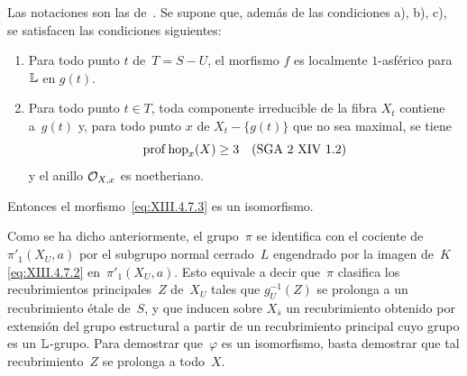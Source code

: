 
\setcounter{subsubsection}{3}

\begin{subproposition}
\label{XIII.4.7.4} Las notaciones son las de~. Se supone
que, además de las condiciones \textup{a), b), c)}, se satisfacen las
condiciones siguientes:
\begin{enumerate}
\item[d)] Para todo punto $t$ de~$T=S-U$, el morfismo $f$ es localmente
$1$-asférico para~$\LL$ en $g(t)$.
\item[e)] Para todo punto $t\in T$, toda componente irreducible de la
fibra $X_t$ contiene a~$g(t)$ y, para todo punto $x$ de
$X_t-\{g(t)\}$ que no sea maximal, se tiene
$$
\prof\hop_x(X)\geq 3 \quad\textup{(SGA~2 XIV~1.2)}
$$
y el anillo $\cal{O}_{X,x}$ es noetheriano.
\end{enumerate}

Entonces el morfismo~\eqref{eq:XIII.4.7.3} es un isomorfismo.
\end{subproposition}

Como se ha dicho anteriormente, el grupo~$\pi$ se identifica con el
cociente de~$\pi'_1(X_U,a)$ por el subgrupo normal cerrado~$L$ engendrado
por la imagen de~$K$ \eqref{eq:XIII.4.7.2} en~$\pi'_1(X_U,a)$. Esto
equivale a decir que~$\pi$ clasifica los
recubrimientos principales~$Z$ de~$X_U$ tales que $g^{-1}_U(Z)$ se
prolonga a un recubrimiento étale de~$S$, y que inducen sobre
$X_{\bar{s}}$ un recubrimiento obtenido por extensión del grupo
estructural a partir de un recubrimiento principal cuyo grupo es un
$\LL$-grupo. Para demostrar que~$\varphi$ es un isomorfismo, basta
demostrar que tal recubrimiento~$Z$ se prolonga a todo~$X$.

